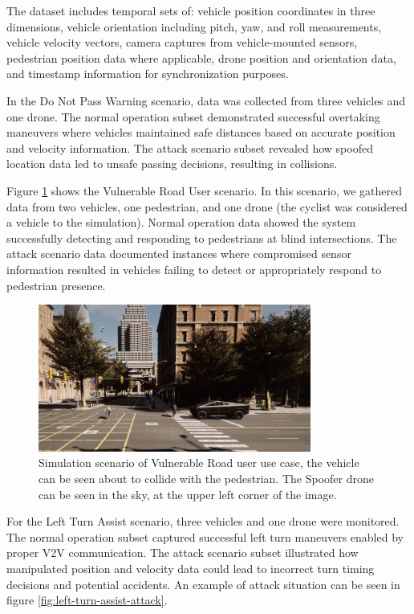 The dataset includes temporal sets of: vehicle position coordinates in three dimensions, vehicle orientation including pitch, yaw, and roll measurements, vehicle velocity vectors, camera captures from vehicle-mounted sensors, pedestrian position data where applicable, drone position and orientation data, and timestamp information for synchronization purposes.

In the Do Not Pass Warning scenario, data was collected from three vehicles and one drone. The normal operation subset demonstrated successful overtaking maneuvers where vehicles maintained safe distances based on accurate position and velocity information. The attack scenario subset revealed how spoofed location data led to unsafe passing decisions, resulting in collisions.

Figure \ref{fig:vulnerable-road-user-attack} shows the Vulnerable Road User scenario. In this scenario, we gathered data from two vehicles, one pedestrian, and one drone (the cyclist was considered a vehicle to the simulation). Normal operation data showed the system successfully detecting and responding to pedestrians at blind intersections. The attack scenario data documented instances where compromised sensor information resulted in vehicles failing to detect or appropriately respond to pedestrian presence.

\begin{figure} [!ht]
    \centering
    \includegraphics[width=0.8\textwidth]{parts/figuras/vulnerable-road-user.png}
    \caption{Simulation scenario of Vulnerable Road user use case, the vehicle can be seen about to collide with the pedestrian. The Spoofer drone can be seen in the sky, at the upper left corner of the image.}
    \label{fig:vulnerable-road-user-attack}
\end{figure}

For the Left Turn Assist scenario, three vehicles and one drone were monitored. The normal operation subset captured successful left turn maneuvers enabled by proper V2V communication. The attack scenario subset illustrated how manipulated position and velocity data could lead to incorrect turn timing decisions and potential accidents. An example of attack situation can be seen in figure \ref{fig:left-turn-assist-attack}.

